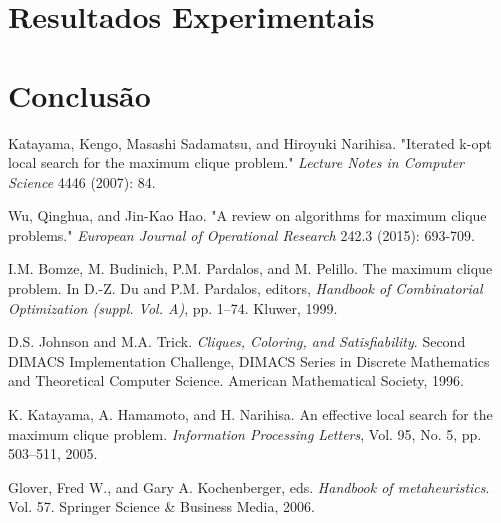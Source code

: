 \documentclass{article}
\begin{document}
\section{Resultados Experimentais}
\section{Conclusão}


\begin{thebibliography}{58}

  Katayama, Kengo, Masashi Sadamatsu, and Hiroyuki Narihisa. 
"Iterated k-opt local search for the maximum clique problem." 
\textit{Lecture Notes in Computer Science} 4446 (2007): 84.

Wu, Qinghua, and Jin-Kao Hao. 
"A review on algorithms for maximum clique problems." 
\textit{European Journal of Operational Research} 242.3 (2015): 693-709.

I.M. Bomze, M. Budinich, P.M. Pardalos, and M. Pelillo. The maximum clique
problem. In D.-Z. Du and P.M. Pardalos, editors, \textit{Handbook of Combinatorial
Optimization (suppl. Vol. A)}, pp. 1–74. Kluwer, 1999.

D.S. Johnson and M.A. Trick. \textit{Cliques, Coloring, and Satisfiability}. Second DIMACS
Implementation Challenge, DIMACS Series in Discrete Mathematics and
Theoretical Computer Science. American Mathematical Society, 1996.

 K. Katayama, A. Hamamoto, and H. Narihisa. An effective local search for the
maximum clique problem. \textit{Information Processing Letters}, Vol. 95, No. 5, pp.
503–511, 2005.

Glover, Fred W., and Gary A. Kochenberger, eds. \textit{Handbook of metaheuristics}. Vol. 57. Springer Science \& Business Media, 2006.

\end{thebibliography}
\end{document}
